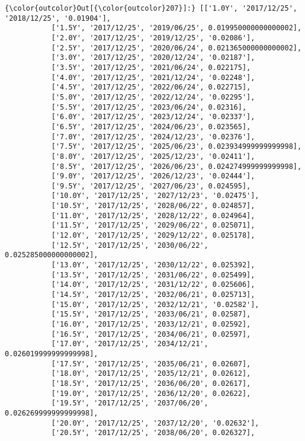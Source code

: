 \documentclass[11pt]{article}
\begin{document}
\begin{Verbatim}[commandchars=\\\{\}]
{\color{outcolor}Out[{\color{outcolor}207}]:} [['1.0Y', '2017/12/25', '2018/12/25', '0.01904'],
           ['1.5Y', '2017/12/25', '2019/06/25', 0.019950000000000002],
           ['2.0Y', '2017/12/25', '2019/12/25', '0.02086'],
           ['2.5Y', '2017/12/25', '2020/06/24', 0.021365000000000002],
           ['3.0Y', '2017/12/25', '2020/12/24', '0.02187'],
           ['3.5Y', '2017/12/25', '2021/06/24', 0.022175],
           ['4.0Y', '2017/12/25', '2021/12/24', '0.02248'],
           ['4.5Y', '2017/12/25', '2022/06/24', 0.022715],
           ['5.0Y', '2017/12/25', '2022/12/24', '0.02295'],
           ['5.5Y', '2017/12/25', '2023/06/24', 0.02316],
           ['6.0Y', '2017/12/25', '2023/12/24', '0.02337'],
           ['6.5Y', '2017/12/25', '2024/06/23', 0.023565],
           ['7.0Y', '2017/12/25', '2024/12/23', '0.02376'],
           ['7.5Y', '2017/12/25', '2025/06/23', 0.023934999999999998],
           ['8.0Y', '2017/12/25', '2025/12/23', '0.02411'],
           ['8.5Y', '2017/12/25', '2026/06/23', 0.024274999999999998],
           ['9.0Y', '2017/12/25', '2026/12/23', '0.02444'],
           ['9.5Y', '2017/12/25', '2027/06/23', 0.024595],
           ['10.0Y', '2017/12/25', '2027/12/23', '0.02475'],
           ['10.5Y', '2017/12/25', '2028/06/22', 0.024857],
           ['11.0Y', '2017/12/25', '2028/12/22', 0.024964],
           ['11.5Y', '2017/12/25', '2029/06/22', 0.025071],
           ['12.0Y', '2017/12/25', '2029/12/22', 0.025178],
           ['12.5Y', '2017/12/25', '2030/06/22', 0.025285000000000002],
           ['13.0Y', '2017/12/25', '2030/12/22', 0.025392],
           ['13.5Y', '2017/12/25', '2031/06/22', 0.025499],
           ['14.0Y', '2017/12/25', '2031/12/22', 0.025606],
           ['14.5Y', '2017/12/25', '2032/06/21', 0.025713],
           ['15.0Y', '2017/12/25', '2032/12/21', '0.02582'],
           ['15.5Y', '2017/12/25', '2033/06/21', 0.02587],
           ['16.0Y', '2017/12/25', '2033/12/21', 0.02592],
           ['16.5Y', '2017/12/25', '2034/06/21', 0.02597],
           ['17.0Y', '2017/12/25', '2034/12/21', 0.026019999999999998],
           ['17.5Y', '2017/12/25', '2035/06/21', 0.02607],
           ['18.0Y', '2017/12/25', '2035/12/21', 0.02612],
           ['18.5Y', '2017/12/25', '2036/06/20', 0.02617],
           ['19.0Y', '2017/12/25', '2036/12/20', 0.02622],
           ['19.5Y', '2017/12/25', '2037/06/20', 0.026269999999999998],
           ['20.0Y', '2017/12/25', '2037/12/20', '0.02632'],
           ['20.5Y', '2017/12/25', '2038/06/20', 0.026327],

\end{Verbatim}
\end{document}
